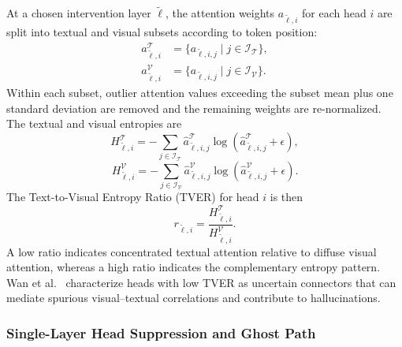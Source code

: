 At a chosen intervention layer $\tilde{\ell}$, the attention weights $a_{\tilde{\ell},i}$ for each head $i$ are split into textual and visual subsets according to token position:
\begin{equation}
\begin{aligned}
a_{\tilde{\ell},i}^{\mathcal{T}} &= \{a_{\tilde{\ell},i,j} \mid j \in \mathcal{I}_{\mathcal{T}}\}, \\
a_{\tilde{\ell},i}^{\mathcal{V}} &= \{a_{\tilde{\ell},i,j} \mid j \in \mathcal{I}_{\mathcal{V}}\}.
\end{aligned}
\end{equation}
Within each subset, outlier attention values exceeding the subset mean plus one standard deviation are removed and the remaining weights are re-normalized. The textual and visual entropies are
\begin{equation}
H_{\tilde{\ell},i}^{\mathcal{T}} = -\sum_{j \in \mathcal{I}_{\mathcal{T}}} \hat{a}_{\tilde{\ell},i,j}^{\mathcal{T}} \log\!\left(\hat{a}_{\tilde{\ell},i,j}^{\mathcal{T}} + \epsilon\right),
\end{equation}
\begin{equation}
H_{\tilde{\ell},i}^{\mathcal{V}} = -\sum_{j \in \mathcal{I}_{\mathcal{V}}} \hat{a}_{\tilde{\ell},i,j}^{\mathcal{V}} \log\!\left(\hat{a}_{\tilde{\ell},i,j}^{\mathcal{V}} + \epsilon\right).
\end{equation}
The Text-to-Visual Entropy Ratio (TVER) for head $i$ is then
\begin{equation}
r_{\tilde{\ell},i} = \frac{H_{\tilde{\ell},i}^{\mathcal{T}}}{H_{\tilde{\ell},i}^{\mathcal{V}}}.
\end{equation}
A low ratio indicates concentrated textual attention relative to diffuse visual attention, whereas a high ratio indicates the complementary entropy pattern. Wan et al.~\cite{wan2025only} characterize heads with low TVER as uncertain connectors that can mediate spurious visual--textual correlations and contribute to hallucinations.

\subsubsection{Single-Layer Head Suppression and Ghost Path}


